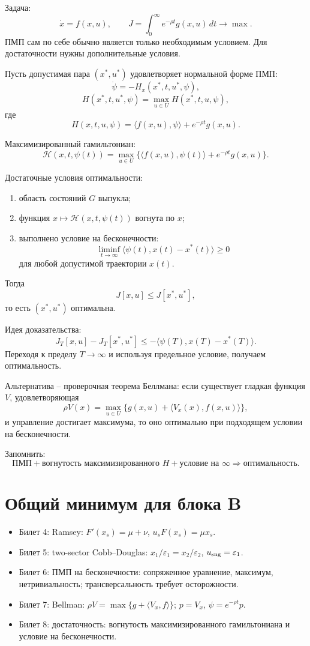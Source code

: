 \documentclass[12pt,a4paper]{article}
\begin{document}
Задача:
\[
\dot x=f(x,u),
\qquad
J=\int_0^\infty e^{-\rho t}g(x,u)\,dt\to\max.
\]
ПМП сам по себе обычно является только необходимым условием. Для достаточности нужны дополнительные условия.

Пусть допустимая пара $(x^*,u^*)$ удовлетворяет нормальной форме ПМП:
\[
\dot\psi=-H_x(x^*,t,u^*,\psi),
\]
\[
H(x^*,t,u^*,\psi)=\max_{u\in U}H(x^*,t,u,\psi),
\]
где
\[
H(x,t,u,\psi)=\langle f(x,u),\psi\rangle+e^{-\rho t}g(x,u).
\]

Максимизированный гамильтониан:
\[
\mathcal H(x,t,\psi(t))=
\max_{u\in U}\{\langle f(x,u),\psi(t)\rangle+e^{-\rho t}g(x,u)\}.
\]

Достаточные условия оптимальности:
\begin{enumerate}
\item область состояний $G$ выпукла;
\item функция $x\mapsto\mathcal H(x,t,\psi(t))$ вогнута по $x$;
\item выполнено условие на бесконечности:
\[
\liminf_{t\to\infty}\langle \psi(t),x(t)-x^*(t)\rangle\ge0
\]
для любой допустимой траектории $x(t)$.
\end{enumerate}
Тогда
\[
J[x,u]\le J[x^*,u^*],
\]
то есть $(x^*,u^*)$ оптимальна.

Идея доказательства:
\[
J_T[x,u]-J_T[x^*,u^*]
\le
-\langle \psi(T),x(T)-x^*(T)\rangle.
\]
Переходя к пределу $T\to\infty$ и используя предельное условие, получаем оптимальность.

Альтернатива -- проверочная теорема Беллмана: если существует гладкая функция $V$, удовлетворяющая
\[
\rho V(x)=\max_{u\in U}\{g(x,u)+\langle V_x(x),f(x,u)\rangle\},
\]
и управление достигает максимума, то оно оптимально при подходящем условии на бесконечности.

Запомнить:
\[
\text{ПМП}+\text{вогнутость максимизированного }H+\text{условие на }\infty
\Rightarrow \text{оптимальность}.
\]

\section*{Общий минимум для блока B}

\begin{itemize}
\item Билет 4: Ramsey: $F'(x_s)=\mu+\nu$, $u_sF(x_s)=\mu x_s$.
\item Билет 5: two-sector Cobb--Douglas: $x_1/\varepsilon_1=x_2/\varepsilon_2$, $u_{\rm sng}=\varepsilon_1$.
\item Билет 6: ПМП на бесконечности: сопряженное уравнение, максимум, нетривиальность; трансверсальность требует осторожности.
\item Билет 7: Bellman: $\rho V=\max\{g+\langle V_x,f\rangle\}$; $p=V_x$, $\psi=e^{-\rho t}p$.
\item Билет 8: достаточность: вогнутость максимизированного гамильтониана и условие на бесконечности.
\end{itemize}
\end{document}
